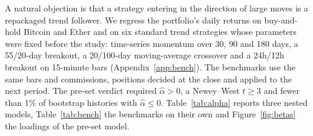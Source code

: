 \documentclass[11pt,a4paper]{article}
\newcommand{\1}{\mathbf{1}}
\begin{document}
A natural objection is that a strategy entering in the direction of large moves is a repackaged trend follower. We regress the portfolio's daily returns on buy-and-hold Bitcoin and Ether and on six standard trend strategies whose parameters were fixed before the study: time-series momentum over 30, 90 and 180 days, a 55/20-day breakout, a 20/100-day moving-average crossover and a 24h/12h breakout on 15-minute bars (Appendix~\ref{app:bench}). The benchmarks use the same bars and commissions, positions decided at the close and applied to the next period. The pre-set verdict required $\hat\alpha>0$, a Newey--West $t\ge3$ \citep{HarveyLiuZhu2016} and fewer than 1\% of bootstrap histories with $\hat\alpha\le0$. Table~\ref{tab:alpha} reports three nested models, Table~\ref{tab:bench} the benchmarks on their own and Figure~\ref{fig:betas} the loadings of the pre-set model.
\end{document}

